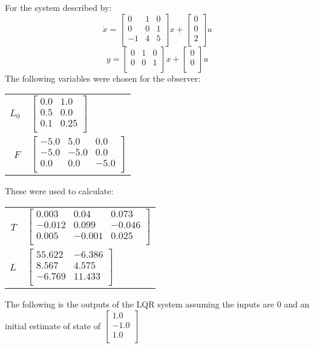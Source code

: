 For the system described by: 
\begin{equation}
\dot x = \begin{bmatrix}
0&1&0\\0&0&1\\-1&4&5\\\end{bmatrix}
x + \begin{bmatrix}
0\\0\\2\\\end{bmatrix}
u
\end{equation}
\begin{equation}
y = \begin{bmatrix}
0&1&0\\0&0&1\\\end{bmatrix}
x + \begin{bmatrix}
0\\0\\\end{bmatrix}
u
\end{equation}
The following variables were chosen for the observer:

\begin{tabular}{r|l}
$L_0$ & $\begin{bmatrix}
0.0&1.0\\0.5&0.0\\0.1&0.25\\\end{bmatrix}
$\\
$F$ & $\begin{bmatrix}
-5.0&5.0&0.0\\-5.0&-5.0&0.0\\0.0&0.0&-5.0\\\end{bmatrix}
$\\
\end{tabular}

These were used to calculate: 

\begin{tabular}{r|l}
$T$ & $\begin{bmatrix}
0.003&0.04&0.073\\-0.012&0.099&-0.046\\0.005&-0.001&0.025\\\end{bmatrix}
$\\
$L$ & $\begin{bmatrix}
55.622&-6.386\\8.567&4.575\\-6.769&11.433\\\end{bmatrix}
$\\
\end{tabular}

The following is the outputs of the LQR system assuming the inputs are 0 and an initial estimate of state of $\begin{bmatrix}
1.0\\-1.0\\1.0\\\end{bmatrix}
$

